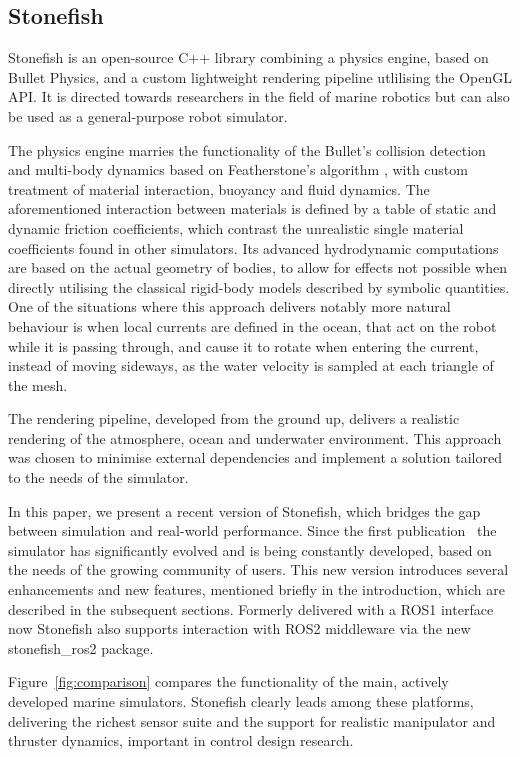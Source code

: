 
\subsection{Stonefish}
Stonefish is an open-source C++ library combining a physics engine, based on Bullet Physics, and a custom lightweight rendering pipeline utlilising the OpenGL API. It is directed towards researchers in the field of marine robotics but can also be used as a general-purpose robot simulator.

The physics engine marries the functionality of the Bullet's collision detection and multi-body dynamics based on Featherstone's algorithm \cite{featherstone}, with custom treatment of material interaction, buoyancy and fluid dynamics. The aforementioned interaction between materials is defined by a table of static and dynamic friction coefficients, which contrast the unrealistic single material coefficients found in other simulators. Its advanced hydrodynamic computations are based on the actual geometry of bodies, to allow for effects not possible when directly utilising the classical rigid-body models described by symbolic quantities. One of the situations where this approach delivers notably more natural behaviour is when local currents are defined in the ocean, that act on the robot while it is passing through, and cause it to rotate when entering the current, instead of moving sideways, as the water velocity is sampled at each triangle of the mesh. 

The rendering pipeline, developed from the ground up, delivers a realistic rendering of the atmosphere, ocean and underwater environment. This approach was chosen to minimise external dependencies and implement a solution tailored to the needs of the simulator.

In this paper, we present a recent version of Stonefish, which bridges the gap between simulation and real-world performance. Since the first publication~\cite{cieslak2019stonefish} the simulator has significantly evolved and is being constantly developed, based on the needs of the growing community of users. This new version introduces several enhancements and new features, mentioned briefly in the introduction, which are described in the subsequent sections. Formerly delivered with a ROS1 interface now Stonefish also supports interaction with ROS2 middleware via the new stonefish\_ros2 package.

Figure~\ref{fig:comparison} compares the functionality of the main, actively developed marine simulators. Stonefish clearly leads among these platforms, delivering the richest sensor suite and the support for realistic manipulator and thruster dynamics, important in control design research.

